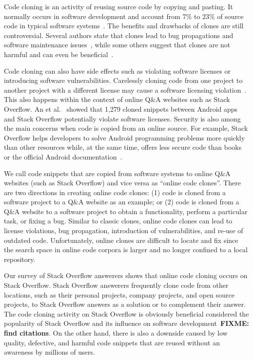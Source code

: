\documentclass[10pt,journal,compsoc]{IEEEtran}
\newcommand\FIXME[1]{{\color{red}\textbf{FIXME: #1}}}
\begin{document}
Code cloning is an activity of reusing source code by copying and
pasting. It normally occurs in software development and account from
7\% to 23\% of source code in typical software
systems~\cite{Bellon2007}. The benefits and drawbacks of clones are
still controversial. Several authors state that clones lead to bug
propagations and software maintenance issues~\cite{Kamiya2002}, while
some others suggest that clones are not harmful and can even be
beneficial~\cite{Saini2016,Kapser2006}.

Code cloning can also have side effects such as violating software
licenses or introducing software vulnerabilities. Carelessly cloning
code from one project to another project with a different license may
cause a software licensing violation~\cite{German2009}. This also
happens within the context of online Q\&A websites such as Stack
Overflow. An et al.~\cite{An2017} showed that 1,279 cloned snippets
between Android apps and Stack Overflow potentially violate software
licenses. Security is also among the main concerns when code is copied
from an online source. For example, Stack Overflow helps developers to solve
Android programming problems more quickly than other resources while,
at the same time, offers less secure code than books or the official
Android documentation~\cite{Acar2016}.

We call code snippets that are copied from software systems to online
Q\&A websites (such as Stack Overflow) and vice versa as ``online
code clones''. There are two
directions in creating online code clones: (1) code is cloned from a software
project to a Q\&A website as an example; or (2) code is cloned from a
Q\&A website to a software project to obtain a functionality, perform
a particular task, or fixing a bug.
Similar to classic clones, online code clones can lead to license
violations, bug propagation, introduction of vulnerabilities, and
re-use of outdated code. Unfortunately, online clones are 
difficult to locate and fix since the search space in online code
corpora is larger and no longer confined to a local repository.

Our survey of Stack Overflow answerers shows that online code cloning occurs on
Stack Overflow. Stack Overflow answerers frequently
clone code from other locations, such as their personal projects, company
projects, and open source projects, to Stack Overflow answers as a solution or
to complement their answer. The code cloning activity on Stack Overflow
is obviously beneficial considered the popularity of Stack Overflow and its
influence on software development~\FIXME{find citations}. On the other hand,
there is also a downside caused by low quality, defective, and harmful code
snippets that are reused without an awareness by millions of users.
\end{document}
